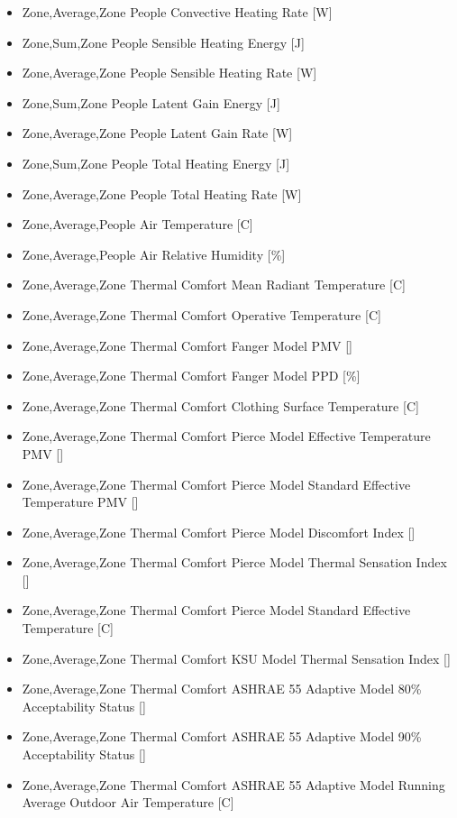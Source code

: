 \begin{itemize}
\item
  Zone,Average,Zone People Convective Heating Rate {[}W{]}
\item
  Zone,Sum,Zone People Sensible Heating Energy {[}J{]}
\item
  Zone,Average,Zone People Sensible Heating Rate {[}W{]}
\item
  Zone,Sum,Zone People Latent Gain Energy {[}J{]}
\item
  Zone,Average,Zone People Latent Gain Rate {[}W{]}
\item
  Zone,Sum,Zone People Total Heating Energy {[}J{]}
\item
  Zone,Average,Zone People Total Heating Rate {[}W{]}
\item
  Zone,Average,People Air Temperature {[}C{]}
\item
  Zone,Average,People Air Relative Humidity {[}\%{]}
\item
  Zone,Average,Zone Thermal Comfort Mean Radiant Temperature {[}C{]}
\item
  Zone,Average,Zone Thermal Comfort Operative Temperature {[}C{]}
\item
  Zone,Average,Zone Thermal Comfort Fanger Model PMV {[]}
\item
  Zone,Average,Zone Thermal Comfort Fanger Model PPD {[}\%{]}
\item
  Zone,Average,Zone Thermal Comfort Clothing Surface Temperature {[}C{]}
\item
  Zone,Average,Zone Thermal Comfort Pierce Model Effective Temperature PMV {[]}
\item
  Zone,Average,Zone Thermal Comfort Pierce Model Standard Effective Temperature PMV {[]}
\item
  Zone,Average,Zone Thermal Comfort Pierce Model Discomfort Index {[]}
\item
  Zone,Average,Zone Thermal Comfort Pierce Model Thermal Sensation Index {[]}
\item
  Zone,Average,Zone Thermal Comfort Pierce Model Standard Effective Temperature {[C]}
\item
  Zone,Average,Zone Thermal Comfort KSU Model Thermal Sensation Index {[]}
\item
  Zone,Average,Zone Thermal Comfort ASHRAE 55 Adaptive Model 80\% Acceptability Status {[]}
\item
  Zone,Average,Zone Thermal Comfort ASHRAE 55 Adaptive Model 90\% Acceptability Status {[]}
\item
  Zone,Average,Zone Thermal Comfort ASHRAE 55 Adaptive Model Running Average Outdoor Air Temperature {[}C{]}

\end{itemize}

